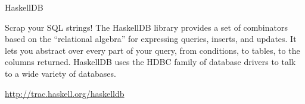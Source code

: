 \begin{hcarentry}[new]{HaskellDB}
\makeheader 

Scrap your SQL strings! The HaskellDB library provides a set of
combinators based on the ``relational algebra'' for expressing
queries, inserts, and updates. It lets you abstract over every part of
your query, from conditions, to tables, to the columns
returned. HaskellDB uses the HDBC family of database drivers to talk to a
wide variety of databases.

\FurtherReading
  \url{http://trac.haskell.org/haskelldb}
\end{hcarentry}
